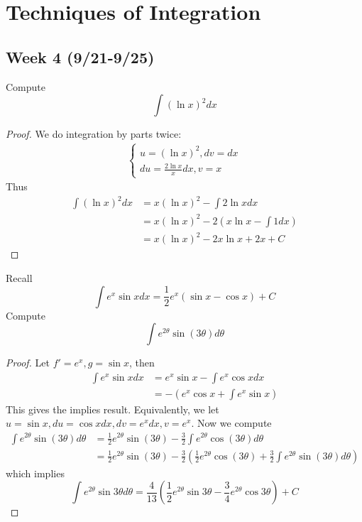 \documentclass[openany]{book}
\begin{document}
\chapter{Techniques of Integration}
\section*{\centering Week 4 (9/21-9/25)}


\begin{prob}
    Compute 
    \begin{equation*}
        \int(\ln x)^2dx
    \end{equation*}
\end{prob}
\begin{proof}
    We do integration by parts twice:
    \begin{align*}
        \begin{cases}
            u=(\ln x)^2, dv=dx\\
            du=\frac{2\ln x}{x}dx, v=x
        \end{cases}
    \end{align*}
    Thus 
    \begin{align*}
        \int(\ln x)^2dx&=x(\ln x)^2-\int 2\ln xdx\\
        &=x(\ln x)^2-2\left(x\ln x-\int 1dx\right)\\
        &=x(\ln x)^2-2x\ln x+2x+C
    \end{align*}
\end{proof}

\begin{prob}
    Recall 
    \begin{equation*}
        \int e^x\sin xdx=\frac{1}{2}e^x(\sin x-\cos x)+C
    \end{equation*}
    Compute 
    \begin{equation*}
        \int e^{2\theta}\sin(3\theta)d\theta
    \end{equation*}
\end{prob}
\begin{proof}
    Let $f'=e^x, g=\sin x$, then 
    \begin{align*}
        \int e^x\sin xdx&=e^x\sin x-\int e^x\cos xdx\\
        &=-\left(e^x\cos x+\int e^x\sin x\right) \tag{IBP twice}
    \end{align*}
    This gives the implies result. Equivalently, we let $u=\sin x, du=\cos xdx, dv=e^xdx, v=e^x$. Now we compute
    \begin{align*}
        \int e^{2\theta}\sin(3\theta)d\theta&=\frac{1}{2}e^{2\theta}\sin(3\theta)-\frac{3}{2}\int e^{2\theta}\cos(3\theta)d\theta\\
        &=\frac{1}{2}e^{2\theta}\sin(3\theta)-\frac{3}{2}\left(\frac{1}{2}e^{2\theta}\cos(3\theta)+\frac{3}{2}\int e^{2\theta}\sin(3\theta)d\theta\right)
    \end{align*}
    which implies 
    \begin{equation*}
        \int e^{2\theta}\sin 3\theta d\theta=\frac{4}{13}\left(\frac{1}{2}e^{2\theta}\sin 3\theta-\frac{3}{4}e^{2\theta}\cos 3\theta\right)+C
    \end{equation*}
\end{proof}
\end{document}
